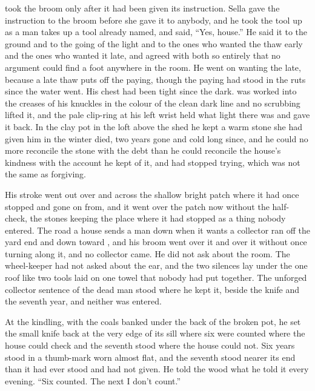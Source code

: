 \scenebreak

 took the broom only after it had been given its instruction. Sella gave the instruction to the broom before she gave it to anybody, and he took the tool up as a man takes up a tool already named, and said, “Yes, house.” He said it to the ground and to the going of the light and to the ones who wanted the thaw early and the ones who wanted it late, and agreed with both so entirely that no argument could find a foot anywhere in the room. He went on wanting the late, because a late thaw puts off the paying, though the paying had stood in the ruts since the water went. His chest had been tight since the dark.  was worked into the creases of his knuckles in the colour of the clean dark line and no scrubbing lifted it, and the pale clip-ring at his left wrist held what light there was and gave it back. In the clay pot in the loft above the shed he kept a warm stone she had given him in the winter  died, two years gone and cold long since, and he could no more reconcile the stone with the debt than he could reconcile the house's kindness with the account he kept of it, and had stopped trying, which was not the same as forgiving.

His stroke went out over  and across the shallow bright patch where it had once stopped and gone on from, and it went over the patch now without the half-check, the stones keeping the place where it had stopped as a thing nobody entered. The road a house sends a man down when it wants a collector ran off the yard end and down toward , and his broom went over it and over it without once turning along it, and no collector came. He did not ask about the room. The wheel-keeper had not asked about the ear, and the two silences lay under the one roof like two tools laid on one towel that nobody had put together. The unforged collector sentence of the dead man stood where he kept it, beside the knife and the seventh year, and neither was entered.

At the kindling, with the coals banked under the back of the broken pot, he set the small knife back at the very edge of its sill where six were counted where the house could check and the seventh stood where the house could not. Six years stood in a thumb-mark worn almost flat, and the seventh stood nearer its end than it had ever stood and had not given. He told the wood what he told it every evening. “Six counted. The next I don't count.”

